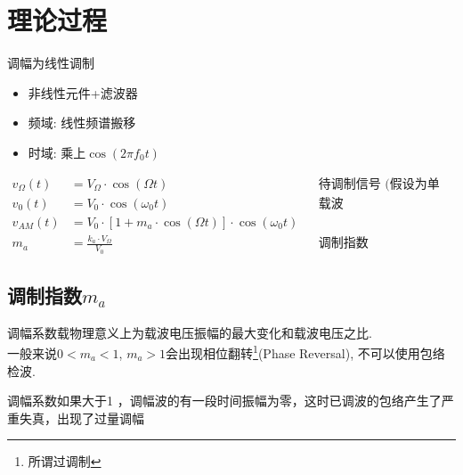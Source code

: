 \documentclass[a4paper]{report}
\begin{document}
\section{理论过程}
调幅为线性调制
\begin{itemize}
  \item 非线性元件+滤波器
  \item 频域: 线性频谱搬移
  \item 时域: 乘上$\cos(2\pi f_0 t)$
\end{itemize}
\begin{align*}
  v_{\Omega}(t)&=V_\Omega\cdot \cos(\Omega t)&&\text{待调制信号 (假设为单频调制)}\\
  v_0(t)&=V_0\cdot\cos(\omega_0 t) &&\text{载波}\\
  v_{AM}(t)&=V_0\cdot [1+m_a\cdot \cos(\Omega t)]\cdot \cos(\omega_0 t)\\
  m_a&=\frac{k_a\cdot V_\Omega}{V_0}&&\text{调制指数}
\end{align*}
\subsection{调制指数$m_a$}
调幅系数载物理意义上为载波电压振幅的最大变化和载波电压之比. \\
一般来说$0<m_a<1$, $m_a>1$会出现相位翻转\footnote{所谓过调制}(Phase Reversal), 不可以使用包络检波. 

调幅系数如果大于1 ，调幅波的有一段时间振幅为零，这时已调波的包络产生了严重失真，出现了过量调幅
\end{document}
